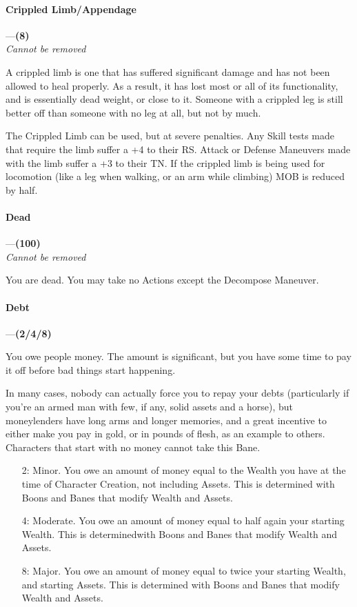 \documentclass[oneside,11pt,english]{book}
\begin{document}
\paragraph{\label{bane:Crippled Limb/Appendage}Crippled Limb/Appendage}---\quad\textbf{(8)}\\
\textit{Cannot be removed}\par
A crippled limb is one that has suffered significant damage and has not been allowed to heal properly. As 
a result, it has lost most or all of its functionality, and is essentially dead weight, or close to it. Someone with a crippled leg is still better off than someone with no leg at all, but not by much.


The Crippled Limb can be used, but at severe penalties. Any Skill tests made that require the limb suffer a +4 to their RS. Attack or Defense Maneuvers made with the limb suffer a +3 to their TN. If the crippled limb is being used for locomotion (like a leg when walking, or an arm while climbing) MOB is reduced by half.
\paragraph{\label{bane:Dead}Dead}---\quad\textbf{(100) }\\
\textit{Cannot be removed}\par
You are dead. You may take no Actions except the Decompose Maneuver.
\paragraph{\label{bane:Debt}Debt}---\quad\textbf{(2/4/8) }\par
You owe people money. The amount is significant, but you have some time to pay it off before bad things 
start happening. 


In many cases, nobody can actually force you to repay your debts (particularly if you're an armed man 
with few, if any, solid assets and a horse), but moneylenders have long arms and longer memories, and a 
great incentive to either make you pay in gold, or in pounds of flesh, as an example to others. Characters 
that start with no money cannot take this Bane. 
\begin{itemize}
	\item [2:] Minor. You owe an amount of money equal to the Wealth you have at the time of Character Creation, not including Assets. This is determined with Boons and Banes that modify Wealth and Assets. 
	\item [4:] Moderate. You owe an amount of money equal to half again your starting Wealth. This is determinedwith Boons and Banes that modify Wealth and Assets. 
	\item [8:] Major. You owe an amount of money equal to twice your starting Wealth, and starting Assets. This is determined with Boons and Banes that modify Wealth and Assets.
\end{itemize}
\end{document}
